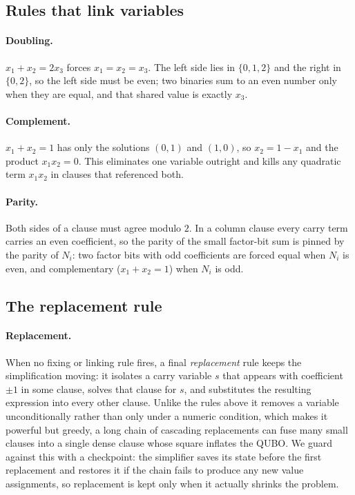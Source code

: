 \documentclass[pdflatex,sn-apa]{sn-jnl}%
\theoremstyle{thmstyleone}%
\theoremstyle{thmstyletwo}%
\theoremstyle{thmstylethree}%
\begin{document}
\begin{appendices}
\subsection{Rules that link variables}

\paragraph{Doubling.} $x_1 + x_2 = 2 x_3$ forces $x_1 = x_2 = x_3$. The left side lies in $\{0,1,2\}$ and the right in $\{0,2\}$, so the left side must be even; two binaries sum to an even number only when they are equal, and that shared value is exactly $x_3$.

\paragraph{Complement.} $x_1 + x_2 = 1$ has only the solutions $(0,1)$ and $(1,0)$, so $x_2 = 1 - x_1$ and the product $x_1 x_2 = 0$. This eliminates one variable outright and kills any quadratic term $x_1 x_2$ in clauses that referenced both.

\paragraph{Parity.} Both sides of a clause must agree modulo $2$. In a column clause every carry term carries an even coefficient, so the parity of the small factor-bit sum is pinned by the parity of $N_i$: two factor bits with odd coefficients are forced equal when $N_i$ is even, and complementary ($x_1 + x_2 = 1$) when $N_i$ is odd.

\subsection{The replacement rule}

\paragraph{Replacement.} When no fixing or linking rule fires, a final \emph{replacement} rule keeps the simplification moving: it isolates a carry variable $s$ that appears with coefficient $\pm 1$ in some clause, solves that clause for $s$, and substitutes the resulting expression into every other clause. Unlike the rules above it removes a variable unconditionally rather than only under a numeric condition, which makes it powerful but greedy, a long chain of cascading replacements can fuse many small clauses into a single dense clause whose square inflates the QUBO. We guard against this with a checkpoint: the simplifier saves its state before the first replacement and restores it if the chain fails to produce any new value assignments, so replacement is kept only when it actually shrinks the problem.


\end{appendices}
\end{document}

